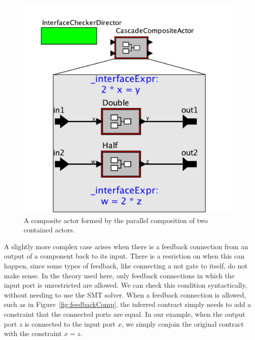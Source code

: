 \documentclass[preprint,11pt]{sigplanconf}
\begin{document}
\begin{figure}[htbp]
\centering
\includegraphics[width=\columnwidth]{figs/parallelComp}
\caption{A composite actor formed by the parallel composition of two contained
actors.}
\label{fig:parallelComp}
\end{figure}

A slightly more complex case arises when there is a feedback connection from an
output of a component back to its input. There is a resriction on when this can
happen, since some types of feedback, like connecting a not gate to itself, do
not make sense. In the theory used here, only feedback connections in which the
input port is unrestricted are allowed. We can check this condition
syntactically, without needing to use the SMT solver.  When a feedback
connection is allowed, such as in Figure~\ref{fig:feedbackComp}, the inferred
contract simply needs to add a constraint that the connected ports are equal.
In our example, when the output port $z$ is connected to the input port $x$, we
simply conjoin the original contract with the constraint $x=z$.
\end{document}
